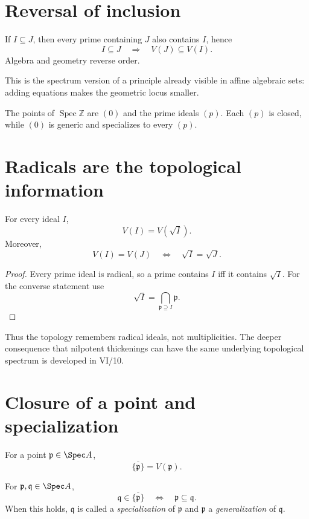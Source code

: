 \section{Reversal of inclusion}

If $I\subseteq J$, then every prime containing $J$ also contains $I$, hence
\[
I\subseteq J
\quad\Longrightarrow\quad
V(J)\subseteq V(I).
\]
Algebra and geometry reverse order.



This is the spectrum version of a principle already visible in affine algebraic sets:
adding equations makes the geometric locus smaller.

\begin{example}\label{ex:vi07-expand-01}
The points of $\operatorname{Spec}\mathbb Z$ are $(0)$ and the prime ideals $(p)$.  Each $(p)$ is closed, while $(0)$ is generic and specializes to every $(p)$.
\end{example}
\section{Radicals are the topological information}

\begin{proposition}
For every ideal $I$,
\[
V(I)=V(\sqrt I).
\]
Moreover,
\[
V(I)=V(J)\quad\Longleftrightarrow\quad \sqrt I=\sqrt J.
\]
\end{proposition}

\begin{proof}
Every prime ideal is radical, so a prime contains $I$ iff it contains $\sqrt I$.
For the converse statement use
\[
\sqrt I=\bigcap_{\mathfrak p\supseteq I}\mathfrak p.
\]
\end{proof}

Thus the topology remembers radical ideals, not multiplicities.  The deeper consequence
that nilpotent thickenings can have the same underlying topological spectrum is developed
in VI/10.

\section{Closure of a point and specialization}

For a point $\mathfrak p\in\Spec A$,
\[
\overline{\{\mathfrak p\}}=V(\mathfrak p).
\]

\begin{theorem}
For $\mathfrak p,\mathfrak q\in\Spec A$,
\[
\mathfrak q\in\overline{\{\mathfrak p\}}
\quad\Longleftrightarrow\quad
\mathfrak p\subseteq\mathfrak q.
\]
When this holds, $\mathfrak q$ is called a \emph{specialization} of $\mathfrak p$ and
$\mathfrak p$ a \emph{generalization} of $\mathfrak q$.
\end{theorem}

